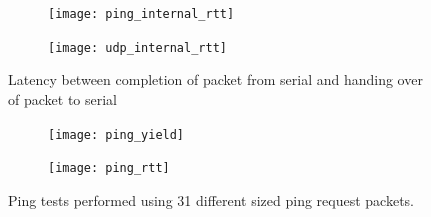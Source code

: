 \begin{figure}
	\begin{subfigure}[c]{0.50\textwidth}
	\centering
		\texttt{[image: ping\_internal\_rtt]}
	\end{subfigure}
\begin{subfigure}[c]{0.50\textwidth}
\centering
		\texttt{[image: udp\_internal\_rtt]}
	\end{subfigure}
	\caption{Latency between completion of packet from serial and handing over of packet to serial}
	\label{f:internal_rtt_figure}
\end{figure}

\begin{figure}
	\begin{subfigure}[c]{0.50\textwidth}
	\centering
		\texttt{[image: ping\_yield]}
	\end{subfigure}
\begin{subfigure}[c]{0.50\textwidth}
\centering
		\texttt{[image: ping\_rtt]}
	\end{subfigure}
	\caption{Ping tests performed using 31 different sized ping request packets.}
	\label{f:ping_figure}
\end{figure}



